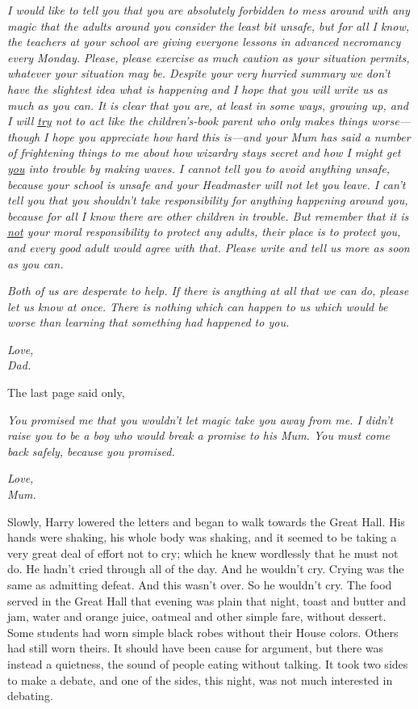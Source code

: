 \emph{I would like to tell you that you are absolutely forbidden to mess around 
with any magic that the adults around you consider the least bit unsafe, but 
for all I know, the teachers at your school are giving everyone lessons in 
advanced necromancy every Monday. Please, please exercise as much caution as 
your situation permits, whatever your situation may be. Despite your very 
hurried summary we don't have the slightest idea what is happening and I hope 
that you will write us as much as you can. It is clear that you are, at least 
in some ways, growing up, and I will \underline{try} not to act like the 
children's-book parent who only makes things worse---though I hope you 
appreciate how hard this is---and your Mum has said a number of frightening 
things to me about how wizardry stays secret and how I might get 
\underline{you} into trouble by making waves. I cannot tell you to avoid 
anything unsafe, because your school is unsafe and your Headmaster will not let 
you leave. I can't tell you that you shouldn't take responsibility for anything 
happening around you, because for all I know there are other children in 
trouble. But remember that it is \underline{not} your moral responsibility to 
protect any adults, their place is to protect you, and every good adult would 
agree with that. Please write and tell us more as soon as you can.}

\emph{Both of us are desperate to help. If there is anything at all that we can 
do, please let us know at once. There is nothing which can happen to us which 
would be worse than learning that something had happened to you.}

\emph{Love,\\
Dad.}

The last page said only,

\emph{You promised me that you wouldn't let magic take you away from me. I 
didn't raise you to be a boy who would break a promise to his Mum. You must 
come back safely, because you promised.}

\emph{Love,\\
Mum.}

Slowly, Harry lowered the letters and began to walk towards the Great Hall. His 
hands were shaking, his whole body was shaking, and it seemed to be taking a 
very great deal of effort not to cry; which he knew wordlessly that he must not 
do. He hadn't cried through all of the day. And he wouldn't cry. Crying was the 
same as admitting defeat. And this wasn't over. So he wouldn't cry.
\sbreak
The food served in the Great Hall that evening was plain that night, toast and 
butter and jam, water and orange juice, oatmeal and other simple fare, without 
dessert. Some students had worn simple black robes without their House colors. 
Others had still worn theirs. It should have been cause for argument, but there 
was instead a quietness, the sound of people eating without talking. It took 
two sides to make a debate, and one of the sides, this night, was not much 
interested in debating.


